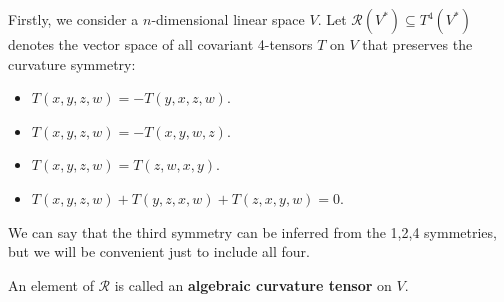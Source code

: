 \documentclass[../main.tex]{subfiles}
\begin{document}
Firstly, we consider a $n$-dimensional linear space $V$. Let $\mathcal{R}(V^*) \subseteq T^4(V^*)$ denotes the vector space of all covariant 4-tensors $T$ on $V$ that preserves the curvature symmetry:
\begin{itemize}
	\item $T(x, y, z, w) = - T(y, x, z, w)$.
	\item $T(x, y, z, w) = - T(x, y, w, z)$.
	\item $T(x, y, z, w) = T(z, w, x, y)$.
	\item $T(x, y, z, w) + T(y, z, x, w) + T(z, x, y, w) = 0$.
\end{itemize}
\begin{remark}
	We can say that the third symmetry can be inferred from the 1,2,4 symmetries, but we will be convenient just to include all four.
\end{remark}
An element of $\mathcal{R}$ is called an \textbf{algebraic curvature tensor} on $V$.
\end{document}
